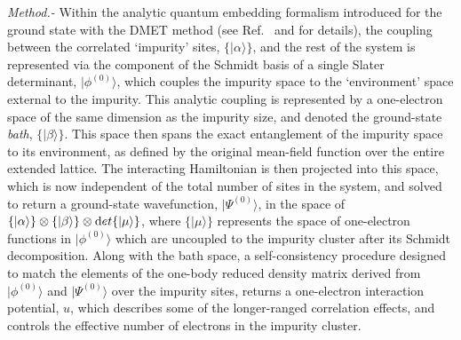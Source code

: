 \documentclass[aps,showpacs,twocolumn,nobibnotes]{revtex4}
\begin{document}
\emph{Method.-} Within the analytic quantum embedding formalism introduced for the ground state with the DMET method (see 
Ref.~ and  for details), the coupling between the correlated `impurity' sites, $\{ |\alpha \rangle \}$, and the rest 
of the system is represented via the component of the Schmidt basis of a single Slater determinant, $|\phi^{(0)}\rangle$, which couples the impurity space to 
the `environment' space external to the impurity. This analytic coupling is represented by a one-electron space of the same dimension as 
the impurity size, and denoted the ground-state {\em bath}, $\{ |\beta \rangle \}$. This space then spans the exact entanglement of the 
impurity space to its environment, as defined by the original mean-field function over the entire extended lattice. The interacting Hamiltonian 
is then projected into this space, which is now independent of the total number of sites in the system, and solved to return a ground-state 
wavefunction, $|\Psi^{(0)} \rangle$, in the space of $\{ |\alpha \rangle \} \otimes \{ |\beta \rangle \} \otimes {\textrm det} \{ | \mu \rangle \}$, where $\{ | \mu \rangle \}$ 
represents the space of one-electron functions in $|\phi^{(0)}\rangle$ which are uncoupled to the impurity cluster after its Schmidt decomposition. Along with the 
bath space, a self-consistency procedure designed to match the elements of the one-body reduced density matrix derived from $|\phi^{(0)}\rangle$ and $|\Psi^{(0)} \rangle$ over the impurity sites,
returns a one-electron interaction potential, $u$, which describes some of the longer-ranged correlation effects, and controls the effective number of electrons in the impurity cluster.
\end{document}
